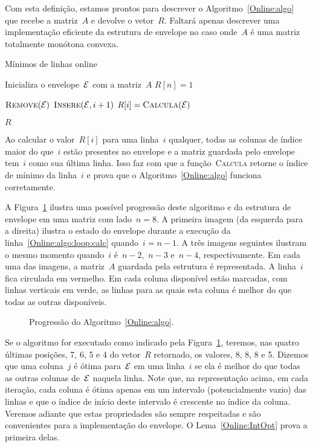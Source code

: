 Com esta definição, estamos prontos para descrever o Algoritmo~\ref{Online:algo} que recebe a matriz~$A$ e devolve o vetor~$R$. Faltará apenas descrever uma implementação eficiente da estrutura de envelope no caso onde~$A$ é uma matriz totalmente monótona convexa.

\begin{algorithm}[h]
\caption{Mínimos de linhas online}
\label{Online:algo}
\begin{algorithmic}[1]
    \State Inicializa o envelope~$\mathcal{E}$ com a matriz~$A$
    \State $R[n] = 1$

     \label{Online:algo:loop}
        \State $\textsc{Remove}(\mathcal{E})$
        \State $\textsc{Insere}(\mathcal{E},i+1)$
        \State $R[i] = \textsc{Calcula}(\mathcal{E})$ \label{Online:algo:loop:calc}
    \EndFor

    \State \Return $R$
\EndFunction
\end{algorithmic}
\end{algorithm}

Ao calcular o valor~$R[i]$ para uma linha~$i$ qualquer, todas as colunas de índice maior do que~$i$ estão presentes no envelope e a matriz guardada pelo envelope tem~$i$ como sua última linha. Isso faz com que a função~\textsc{Calcula} retorne o índice de mínimo da linha~$i$ e prova que o Algoritmo~\ref{Online:algo} funciona corretamente.

A Figura~\ref{Online:progress:fig} ilustra uma possível progressão deste algoritmo e da estrutura de envelope em uma matriz com lado~$n = 8$. A primeira imagem (da esquerda para a direita) ilustra o estado do envelope durante a execução da linha~\ref{Online:algo:loop:calc} quando~${ i = n-1 }$. A três imagens seguintes ilustram o mesmo momento quando~$i$ é~${n-2}$,~${n-3}$ e~${n-4}$, respectivamente. Em cada uma das imagens, a matriz~$A$ guardada pela estrutura é representada. A linha~$i$ fica circulada em vermelho. Em cada coluna disponível estão marcadas, com linhas verticais em verde, as linhas para as quais esta coluna é melhor do que todas as outras disponíveis.

\begin{figure}[h]
    \centering
    
    \caption{Progressão do Algoritmo~\ref{Online:algo}.} \label{Online:progress:fig}
\end{figure}

Se o algoritmo for executado como indicado pela Figura~\ref{Online:progress:fig}, teremos, nas quatro últimas posições, 7, 6, 5 e 4 do vetor~$R$ retornado, os valores, 8, 8, 8 e 5. Dizemos que uma coluna~$j$ é ótima para~$\mathcal{E}$ em uma linha~$i$ se ela é melhor do que todas as outras colunas de~$\mathcal{E}$ naquela linha. Note que, na representação acima, em cada iteração, cada coluna é ótima apenas em um intervalo (potencialmente vazio) das linhas e que o índice de início deste intervalo é crescente no índice da coluna. Veremos adiante que estas propriedades são sempre respeitadas e são convenientes para a implementação do envelope. O Lema~\ref{Online:IntOpt} prova a primeira delas.

